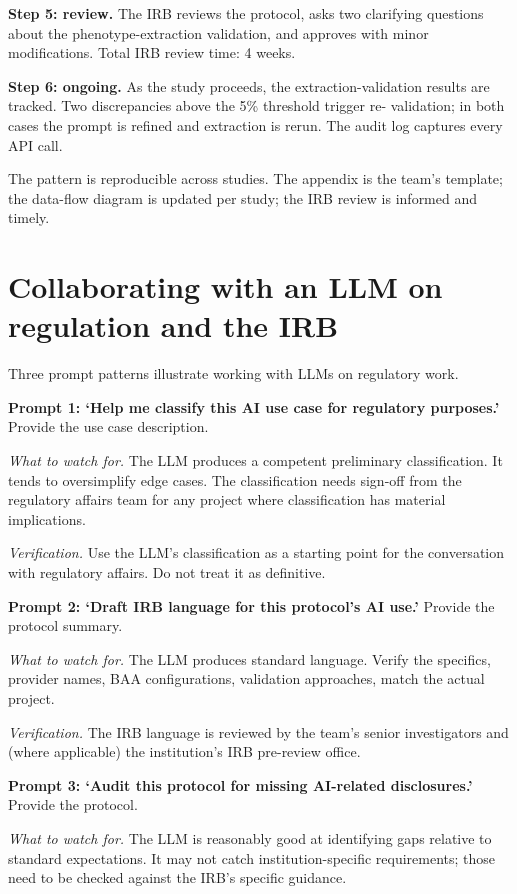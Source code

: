 \documentclass[
  letterpaper,
  11pt]{scrbook}
\begin{document}
\textbf{Step 5: review.} The IRB reviews the protocol, asks two
clarifying questions about the phenotype-extraction validation, and
approves with minor modifications. Total IRB review time: 4 weeks.

\textbf{Step 6: ongoing.} As the study proceeds, the
extraction-validation results are tracked. Two discrepancies above the
5\% threshold trigger re- validation; in both cases the prompt is
refined and extraction is rerun. The audit log captures every API call.

The pattern is reproducible across studies. The appendix is the team's
template; the data-flow diagram is updated per study; the IRB review is
informed and timely.

\section{Collaborating with an LLM on regulation and the
IRB}\label{collaborating-with-an-llm-on-regulation-and-the-irb}

Three prompt patterns illustrate working with LLMs on regulatory work.

\textbf{Prompt 1: `Help me classify this AI use case for regulatory
purposes.'} Provide the use case description.

\emph{What to watch for.} The LLM produces a competent preliminary
classification. It tends to oversimplify edge cases. The classification
needs sign-off from the regulatory affairs team for any project where
classification has material implications.

\emph{Verification.} Use the LLM's classification as a starting point
for the conversation with regulatory affairs. Do not treat it as
definitive.

\textbf{Prompt 2: `Draft IRB language for this protocol's AI use.'}
Provide the protocol summary.

\emph{What to watch for.} The LLM produces standard language. Verify the
specifics, provider names, BAA configurations, validation approaches,
match the actual project.

\emph{Verification.} The IRB language is reviewed by the team's senior
investigators and (where applicable) the institution's IRB pre-review
office.

\textbf{Prompt 3: `Audit this protocol for missing AI-related
disclosures.'} Provide the protocol.

\emph{What to watch for.} The LLM is reasonably good at identifying gaps
relative to standard expectations. It may not catch institution-specific
requirements; those need to be checked against the IRB's specific
guidance.
\end{document}
